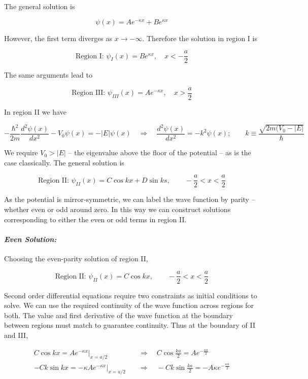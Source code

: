 The general solution is 

\[
  \psi(x) = Ae^{-\kappa x} + Be^{\kappa x} 
\] \vspace{3px}

However, the first term diverges as $x \rightarrow -\infty$. Therefore the
solution in region I is 

 \[
   \text{Region I: } \psi_I(x) = Be^{\kappa x}, \quad x < -\frac{a}{2}
\] \vspace{3px}

The same arguments lead to 

\[
  \text{Region III: }  \psi_{III}(x) = Ae^{-\kappa x}, \quad x > \frac{a}{2}
\] \vspace{3px}


In region II we have

\[
-\frac{\hbar^2}{2m} \frac{d^2 \psi(x)}{d x^2} - V_0 \psi(x) = -|E|\psi(x) \quad
\Rightarrow \quad \frac{d^2 \psi(x)}{d x^2} = -k^2\psi(x); \qquad k \equiv
\frac{\sqrt{2m(V_0 - |E|}}{\hbar}
\] \vspace{3px}

We require $V_0 > |E|$ -- the eigenvalue above the floor of the potential -- as
is the case classically. The general solution is 

\[
  \text{Region II: } \psi_{II}(x) = C\cos kx + D \sin ks, \qquad -\frac{a}{2}
  < x < \frac{a}{2}
\] \vspace{3px}

As the potential is mirror-symmetric, we can label the wave function by parity
-- whether even or odd around zero. In this way we can construct solutions
corresponding to either the even or odd terms in region II. 

\paragraph{\textit{Even Solution:}} Choosing the even-parity solution of region
II, 

\[
  \text{Region II: } \psi_{II}(x) = C\cos kx, \qquad -\frac{a}{2}
  < x < \frac{a}{2} 
\] \vspace{3px}

Second order differential equations require two constraints as initial
conditions to solve. We can use the required continuity of the wave function
across regions for both. The value and first derivative of the wave function at
the boundary between regions must match to guarantee continuity. Thus at the
boundary of II and III, 

\begin{align} \label{}
  C\cos kx = Ae^{-\kappa x}\Big|_{x = a/2} \quad &\Rightarrow  \quad C\cos
  \frac{ka}{2} = Ae^{-\frac{\kappa a }{2}} \\ -Ck\sin kx = -\kappa Ae^{-\kappa
x}\Big|_{x = a/2} \quad &\Rightarrow \quad -Ck\sin \frac{ka}{2} = -A\kappa
e^{-\frac{\kappa a}{2}}
\end{align}\vspace{3px}

